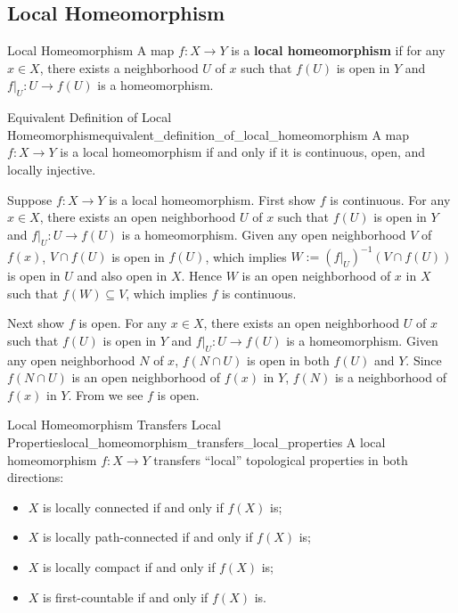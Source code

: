 \documentclass{report}
\begin{document}
\subsection{Local Homeomorphism}


\begin{definition}{Local Homeomorphism}{}
	A map $f:X\to Y$ is a \textbf{local homeomorphism} if for any $x\in X$, there exists a neighborhood $U$ of $x$ such that $f(U)$ is open in $Y$ and $f|_U:U\to f(U)$ is a homeomorphism.
\end{definition}

\begin{proposition}{Equivalent Definition of Local Homeomorphism}{equivalent_definition_of_local_homeomorphism}
	A map $f:X\to Y$ is a local homeomorphism if and only if it is continuous, open, and locally injective.
\end{proposition}
\begin{prf}
	Suppose $f:X\to Y$ is a local homeomorphism. First show 
	$f$ is continuous. For any $x\in X$, there exists an open neighborhood $U$ of $x$ such that $f(U)$ is open in $Y$ and $f|_U:U\to f(U)$ is a homeomorphism. Given any open neighborhood $V$ of $f(x)$, $V\cap f(U)$ is open in $f(U)$, which implies $W:=(f|_U)^{-1}(V\cap f(U))$ is open in $U$ and also open in $X$. Hence $W$ is an open neighborhood of $x$ in $X$ such that $f(W)\subseteq V$, which implies $f$ is continuous.

	Next show $f$ is open. For any $x\in X$, there exists an open neighborhood $U$ of $x$ such that $f(U)$ is open in $Y$ and $f|_U:U\to f(U)$ is a homeomorphism. Given any open neighborhood $N$ of $x$, $f(N \cap U)$ is open in both $f(U)$ and $Y$. Since $f(N\cap U)$ is an open neighborhood of $f(x)$ in $Y$, $f(N)$ is a neighborhood of $f(x)$ in $Y$. From  we see $f$ is open.
\end{prf}

\begin{proposition}{Local Homeomorphism Transfers Local Properties}{local_homeomorphism_transfers_local_properties}
	A local homeomorphism $f: X \rightarrow Y$ transfers ``local'' topological properties in both directions:
	\begin{itemize}
		\item $X$ is locally connected if and only if $f(X)$ is;
		\item  $X$ is locally path-connected if and only if $f(X)$ is;
		\item  $X$ is locally compact if and only if $f(X)$ is;
		\item  $X$ is first-countable if and only if $f(X)$ is.
	\end{itemize}
\end{proposition}
\end{document}
